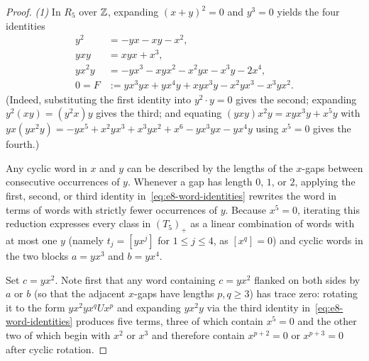 \begin{proof}
\textit{(1)} In $R_5$ over $\mathbb Z$, expanding $(x+y)^2=0$ and $y^3=0$ yields the four identities
\begin{equation}
\begin{aligned}
  y^2 &= -yx-xy-x^2,\\
  yxy &= xyx+x^3,\\
  yx^2y &= -yx^3-xyx^2-x^2yx-x^3y-2x^4,\\
  0 = F &:= yx^3yx+yx^4y+xyx^3y-x^2yx^3-x^3yx^2.
\end{aligned}
  \label{eq:e8-word-identities}
\end{equation}
(Indeed, substituting the first identity into $y^2\cdot y=0$ gives the second; expanding $y^2(xy)=(y^2x)y$ gives the third; and equating $(yxy)x^2y=xyx^3y+x^5y$ with $yx(yx^2y)=-yx^5+x^2yx^3+x^3yx^2+x^6-yx^3yx-yx^4y$ using $x^5=0$ gives the fourth.)

Any cyclic word in $x$ and $y$ can be described by the lengths of the $x$-gaps between consecutive occurrences of $y$. Whenever a gap has length $0$, $1$, or $2$, applying the first, second, or third identity in~\eqref{eq:e8-word-identities} rewrites the word in terms of words with strictly fewer occurrences of $y$. Because $x^5=0$, iterating this reduction expresses every class in $(T_5)_+$ as a linear combination of words with at most one $y$ (namely $t_j=[yx^j]$ for $1\leq j\leq4$, as $[x^q]=0$) and cyclic words in the two blocks $a=yx^3$ and $b=yx^4$.

Set $c=yx^2$. Note first that any word containing $c=yx^2$ flanked on both sides by $a$ or $b$ (so that the adjacent $x$-gaps have lengths $p,q\geq3$) has trace zero: rotating it to the form $yx^2yx^qUx^p$ and expanding $yx^2y$ via the third identity in~\eqref{eq:e8-word-identities} produces five terms, three of which contain $x^5=0$ and the other two of which begin with $x^2$ or $x^3$ and therefore contain $x^{p+2}=0$ or $x^{p+3}=0$ after cyclic rotation.


\end{proof}
